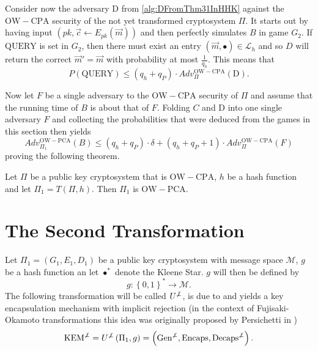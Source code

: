Consider now the adversary $\mathrm{D}$ from \cref{alg:DFromThm31InHHK} against the $\mathrm{OW-CPA}$ security of the not yet transformed cryptosystem $\Pi$. It starts out by having input $\left(pk, \vec{c} \leftarrow E_{pk}\left(\vec{m}\right)\right)$ and then perfectly simulates $B$ in game $G_2$. If $\mathrm{QUERY}$ is set in $G_2$, then there must exist an entry $\left(\vec{m}, \bullet\right) \in \mathcal{L}_h$ and so $D$ will return the correct $\vec{m}' = \vec{m}$ with probability at most $\frac{1}{q_h}$. This means that
\[
	P\left(\mathrm{QUERY}\right) \leq \left(q_h + q_P\right) \cdot Adv_{\Pi}^{\mathrm{OW-CPA}}\left(\mathrm{D}\right).
\]

Now let $F$ be a single adversary to the $\mathrm{OW-CPA}$ security of $\Pi$ and assume that the running time of $B$ is about that of $F$. Folding $C$ and $\mathrm{D}$ into one single adversary $F$ and collecting the probabilities that were deduced from the games in this section then yields
\begin{equation}
\label{eq:boundFromThm31InHHK}
	Adv_{\Pi_1}^{\mathrm{OW-PCA}}\left(B\right) \leq \left( q_h + q_P \right) \cdot \delta + \left( q_h + q_P + 1 \right) \cdot Adv_{\Pi}^{\mathrm{OW-CPA}}\left(F\right)
\end{equation}
proving the following theorem.

\begin{thm}
	Let $\Pi$ be a public key cryptosystem that is $\mathrm{OW-CPA}$, $h$ be a hash function and let $\Pi_1 = T\left(\Pi, h\right)$. Then $\Pi_1$ is $\mathrm{OW-PCA}$.
\end{thm}



\section{The Second Transformation}
\label{sec:theSecMod}

Let $\Pi_1 = \left(G_1, E_1, D_1\right)$ be a public key cryptosystem with message space $\mathcal{M}$, $g$ be a hash function an let $\bullet ^{*}$ denote the Kleene Star. $g$ will then be defined by
\[
	g: \left\{ 0,1 \right\} ^{*} \rightarrow\mathcal{M}.
\]
The following transformation will be called \emph{$U^{\not\bot}$}, is due to \cite{HHK} and yields a key encapsulation mechanism with implicit rejection (in the context of Fujisaki-Okamoto transformations this idea was originally proposed by Persichetti in \cite[section 5.3]{persichetti})
\[
	\mathrm{KEM}^{\not\bot} = U^{\not\bot} \left(\Pi_1, g\right) = \left(\mathrm{Gen}^{\not\bot}, \mathrm{Encaps}, \mathrm{Decaps}^{\not\bot}\right).
\]

